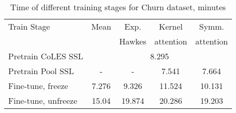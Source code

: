 
\begin{table}[ht]
\caption{\selectfont Time of different training stages for Churn dataset, minutes}
\label{tab:time}

\begin{tabular}{lcccc}
\hline
Train Stage & Mean & Exp.  & Kernel & Symm. \\
            &      & Hawkes &  attention & attention \\
\hline
Pretrain CoLES SSL & \multicolumn{4}{c}{8.295} \\
Pretrain Pool SSL & - & - & 7.541 & 7.664 \\
Fine-tune, freeze & 7.276 & 9.326 & 11.524 & 10.131 \\
Fine-tune, unfreeze & 15.04 & 19.874 & 20.286 & 19.203 \\
\hline
\end{tabular}
\end{table}